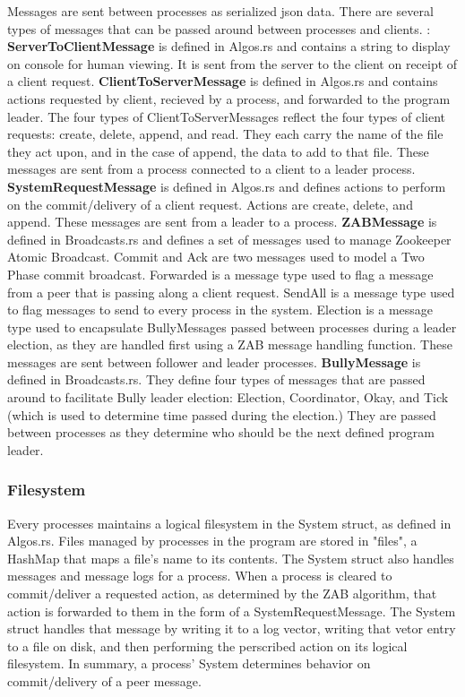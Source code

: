 \documentclass{article}
\begin{document}
	Messages are sent between processes as serialized json data. There are several types of messages that can be passed around between processes and clients. :
		\t\textbf{ServerToClientMessage} is defined in Algos.rs and contains a string to display on console for human viewing. It is sent from the server to the client on receipt of a client request.  
		\t\textbf{ClientToServerMessage} is defined in Algos.rs and contains actions requested by client, recieved by a process, and forwarded to the program leader. The four types of ClientToServerMessages reflect the four types of client requests: create, delete, append, and read. They each carry the name of the file they act upon, and in the case of append, the data to add to that file. These messages are sent from a process connected to a client to a leader process. 
		\t\textbf{SystemRequestMessage} is defined in Algos.rs and defines actions to perform on the commit/delivery of a client request. Actions are create, delete, and append. These messages are sent from a leader to a process.
		\t\textbf{ZABMessage} is defined in Broadcasts.rs and defines a set of messages used to manage Zookeeper Atomic Broadcast. Commit and Ack are two messages used to model a Two Phase commit broadcast. Forwarded is a message type used to flag a message from a peer that is passing along a client request. SendAll is a message type used to flag messages to send to every process in the system. Election is a message type used to encapsulate BullyMessages passed between processes during a leader election, as they are handled first using a ZAB message handling function. These messages are sent between follower and leader processes.
		\t\textbf{BullyMessage} is defined in Broadcasts.rs. They define four types of messages that are passed around to facilitate Bully leader election: Election, Coordinator, Okay, and Tick (which is used to determine time passed during the election.) They are passed between processes as they determine who should be the next defined program leader. 

	\subsubsection*{Filesystem}
		Every processes maintains a logical filesystem in the System struct, as defined in Algos.rs. Files managed by processes in the program are stored in "files", a HashMap that maps a file's name to its contents. The System struct also handles messages and message logs for a process. When a process is cleared to commit/deliver a requested action, as determined by the ZAB algorithm, that action is forwarded to them in the form of a SystemRequestMessage. The System struct handles that message by writing it to a log vector, writing that vetor entry to a file on disk, and then performing the perscribed action on its logical filesystem. In summary, a process' System determines behavior on commit/delivery of a peer message. 
\end{document}
